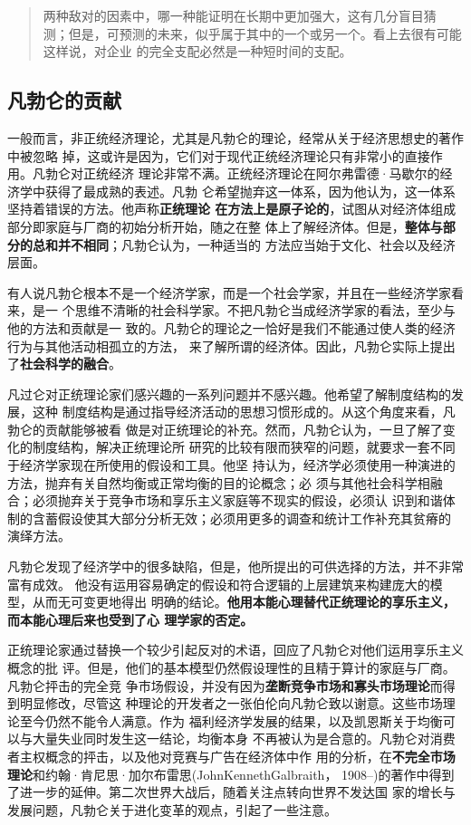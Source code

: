 \begin{quotation}两种敌对的因素中，哪一种能证明在长期中更加强大，这有几分盲目猜
测；但是，可预测的未来，似乎属于其中的一个或另一个。看上去很有可能这样说，对企业
的完全支配必然是一种短时间的支配。
\end{quotation}

\subsection{凡勃仑的贡献}

一般而言，非正统经济理论，尤其是凡勃仑的理论，经常从关于经济思想史的著作中被忽略
掉，这或许是因为，它们对于现代正统经济理论只有非常小的直接作用。凡勃仑对正统经济
理论非常不满。正统经济理论在阿尔弗雷德·马歇尔的经济学中获得了最成熟的表述。凡勃
仑希望抛弃这一体系，因为他认为，这一体系坚持着错误的方法。他声称\textbf{正统理论
在方法上是原子论的}，试图从对经济体组成部分即家庭与厂商的初始分析开始，随之在整
体上了解经济体。但是，\textbf{整体与部分的总和并不相同}；凡勃仑认为，一种适当的
方法应当始于文化、社会以及经济层面。

有人说凡勃仑根本不是一个经济学家，而是一个社会学家，并且在一些经济学家看来，是一
个思维不清晰的社会科学家。不把凡勃仑当成经济学家的看法，至少与他的方法和贡献是一
致的。凡勃仑的理论之一恰好是我们不能通过使人类的经济行为与其他活动相孤立的方法，
来了解所谓的经济体。因此，凡勃仑实际上提出了\textbf{社会科学的融合}。

凡过仑对正统理论家们感兴趣的一系列问题并不感兴趣。他希望了解制度结构的发展，这种
制度结构是通过指导经济活动的思想习惯形成的。从这个角度来看，凡勃仑的贡献能够被看
做是对正统理论的补充。然而，凡勃仑认为，一旦了解了变化的制度结构，解决正统理论所
研究的比较有限而狭窄的问题，就要求一套不同于经济学家现在所使用的假设和工具。他坚
持认为，经济学必须使用一种演进的方法，抛弃有关自然均衡或正常均衡的目的论概念；必
须与其他社会科学相融合；必须抛弃关于竞争市场和享乐主义家庭等不现实的假设，必须认
识到和谐体制的含蓄假设使其大部分分析无效；必须用更多的调查和统计工作补充其贫瘠的
演绎方法。

凡勃仑发现了经济学中的很多缺陷，但是，他所提出的可供选择的方法，并不非常富有成效。
他没有运用容易确定的假设和符合逻辑的上层建筑来构建庞大的模型，从而无可变更地得出
明确的结论。\textbf{他用本能心理替代正统理论的享乐主义，而本能心理后来也受到了心
理学家的否定。}

正统理论家通过替换一个较少引起反对的术语，回应了凡勃仑对他们运用享乐主义概念的批
评。但是，他们的基本模型仍然假设理性的且精于算计的家庭与厂商。凡勃仑抨击的完全竞
争市场假设，并没有因为\textbf{垄断竞争市场和寡头市场理论}而得到明显修改，尽管这
种理论的开发者之一张伯伦向凡勃仑致以谢意。这些市场理论至今仍然不能令人满意。作为
福利经济学发展的结果，以及凯恩斯关于均衡可以与大量失业同时发生这一结论，均衡本身
不再被认为是合意的。凡勃仑对消费者主权概念的抨击，以及他对竞赛与广告在经济体中作
用的分析，在\textbf{不完全市场理论}和约翰·肯尼思·加尔布雷思(JohnKennethGalbraith，
1908--)的著作中得到了进一步的延伸。第二次世界大战后，随着关注点转向世界不发达国
家的增长与发展问题，凡勃仑关于进化变革的观点，引起了一些注意。

